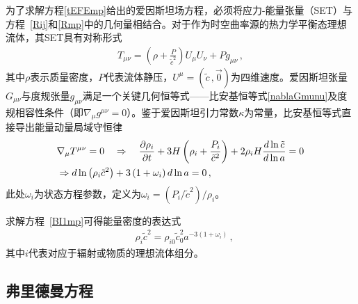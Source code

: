 \documentclass[jkps,preprint,fleqn]{revtex4}
\newcommand{\tc}{\tilde{c}}
\begin{document}
\begin{CJK*}{UTF8}{gbsn}
为了求解方程\eqref{tEFEmp}给出的爱因斯坦场方程，必须将应力-能量张量（SET）与方程~\eqref{Rij}和\eqref{Rmp}中的几何量相结合。对于作为时空曲率源的热力学平衡态理想流体，其SET具有对称形式
\begin{align} T_{\mu\nu} = \left( \rho + \frac{P}{\tc^2} \right) U_{\mu} U_{\nu} + P g_{\mu\nu} \label{Tmunump} \,, \end{align}
其中$\rho$表示质量密度，$P$代表流体静压，$U^{\mu} = (\tc\,,\vec{0})$为四维速度。爱因斯坦张量$G_{\mu\nu}$与度规张量$g_{\mu\nu}$满足一个关键几何恒等式——比安基恒等式\eqref{nablaGmunu}及度规相容性条件（即$\nabla_{\mu} g^{\mu\nu} = 0$）。鉴于爱因斯坦引力常数$\kappa$为常量，比安基恒等式直接导出能量动量局域守恒律
\begin{align} &\nabla_{\mu} \tensor{T}{^\mu^\nu} = 0 \quad \Rightarrow \quad \frac{\partial \rho_i}{\partial t} + 3 H \left( \rho_i + \frac{P_i}{\tc^2} \right) + 2 \rho_i H \frac{d \ln \tc}{d \ln a} = 0 \nonumber \\ &\Rightarrow d \ln \left( \rho_i \tc^2 \right) + 3 \left( 1 + \omega_i \right) d \ln a = 0 \label{BI1mp} \,, \end{align}
此处$\omega_i$为状态方程参数，定义为$\omega_i = (P_i/\tc^2)/\rho_i$。

求解方程~\eqref{BI1mp}可得能量密度的表达式
\begin{align} &\rho_i \tc^{2} = \rho_{i0} \tc_0^2 a^{-3 (1 + \omega_i)} \label{rhomp} \,,\end{align}
其中$i$代表对应于辐射或物质的理想流体组分。
\subsection{弗里德曼方程}\label{subsec:FE}


\end{CJK*}
\end{document}
